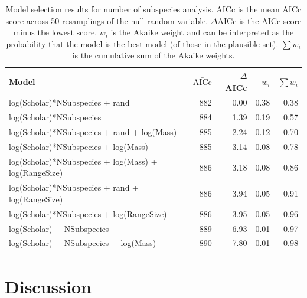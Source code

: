 \begin{table}[t]
\begin{tabular}{>{\small}lrrrr}

\normalsize{Model} & $\bar{\text{AICc}}$ & $\Delta$AICc & $w_i$ & $\sum w_i$\\
\hline
log(Scholar)*NSubspecies + rand & 
882 & 0.00 &
0.38 & 0.38\\
log(Scholar)*NSubspecies & 
884 & 1.39 &
0.19 & 0.57\\
log(Scholar)*NSubspecies + rand + log(Mass) & 
885 & 2.24 &
0.12 & 0.70\\
log(Scholar)*NSubspecies  + log(Mass) & 
885 & 3.14 &
0.08 & 0.78\\
log(Scholar)*NSubspecies  + log(Mass) + log(RangeSize) & 
886 & 3.18 &
0.08 & 0.86\\
log(Scholar)*NSubspecies  + rand + log(RangeSize) & 
886 & 3.94 &
0.05 & 0.91\\
log(Scholar)*NSubspecies  + log(RangeSize) & 
886 & 3.95 &
0.05 & 0.96\\
log(Scholar) + NSubspecies & 
889 & 6.93 &
0.01 & 0.97\\
log(Scholar) + NSubspecies + log(Mass) & 
890 & 7.80 &
0.01 & 0.98
\end{tabular}
\caption[Model selection results for number of subspecies analysis]{
Model selection results for number of subspecies analysis. 
$\bar{\text{AICc}}$ is the mean AICc score across 50 resamplings of the null random variable. 
$\Delta$AICc is the $\bar{\text{AICc}}$ score minus the lowest score. 
$w_i$ is the Akaike weight and can be interpreted as the probability that the model is the best model (of those in the plausible set).
$\sum w_i$ is the cumulative sum of the Akaike weights.}
\label{t:subsmodels}
\end{table}





\clearpage
\section{Discussion}  

















